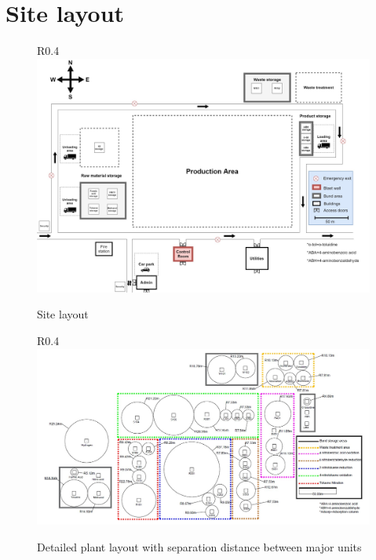 \section{Site layout}


\begin{figure}{R}{0.4\linewidth}
\centering
\includegraphics[width=\linewidth]{chapters/Z-support/figures/Sitelayout.jpg}
\caption{ Site layout}
\label{fig:site}
\end{figure}

\begin{figure}{R}{0.4\linewidth}
\centering
\includegraphics[width=\linewidth]{chapters/Z-support/figures/detailedlayout.jpg}
\caption{Detailed plant layout with separation distance between major units}
\label{fig:detailed_layout}
\end{figure}